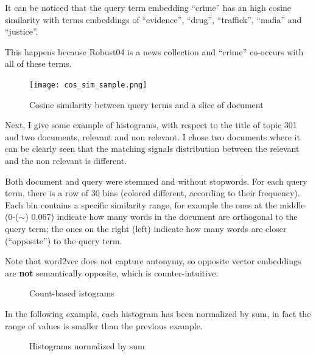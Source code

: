 It can be noticed that the query term embedding ``crime'' has an high cosine similarity with terms embeddings of ``evidence'', ``drug'', ``traffick'', ``mafia'' and ``justice''.

This happens because Robust04 \cite{rob04} is a news collection and ``crime'' co-occurs with all of these terms.

\begin{figure}[H]
  \centering
  \texttt{[image: cos\_sim\_sample.png]}
  \caption{Cosine similarity between query terms and a slice of document}
  \label{fig:cos_sim_sample}
\end{figure}

Next, I give some example of histograms, with respect to the title of topic 301 and two documents, relevant and non relevant. I chose two documents where it can be clearly seen that the matching signals distribution between the relevant and the non relevant is different.

Both document and query were stemmed and without stopwords. For each query term, there is a row of 30 bins (colored different, according to their frequency). Each bin contains a specific similarity range, for
example the ones at the middle (0-($\sim$) 0.067) indicate how many words in the document are orthogonal to the query term; the ones on the right (left) indicate how many words are closer (``opposite'') to the query term.

Note that word2vec does not capture antonymy, so opposite vector embeddings are \textbf{not} semantically opposite, which is counter-intuitive.

\begin{figure}[H]
  \centering
  \hfill
  \caption{Count-based istograms}
  \label{fig:hist_ex}
\end{figure}

In the following example, each histogram has been normalized by sum, in fact
the range of values is smaller than the previous example.

\begin{figure}[H]
  \centering
  \hfill
  \caption{Histograms normalized by sum}
  \label{fig:hist_nh_ex}
\end{figure}

